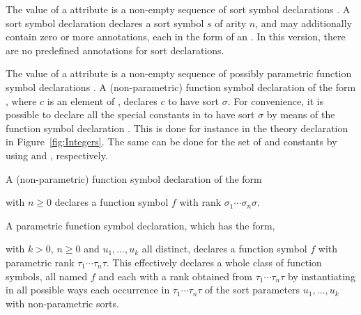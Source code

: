 The value of a  attribute is a non-empty sequence
of sort symbol declarations .
A sort symbol declaration  declares 
a sort symbol $s$ of arity $n$, and 
may additionally contain zero or more annotations,
each in the form of an .
In this version, there are no predefined annotations for sort declarations.

The value of a  attribute is a non-empty sequence
of possibly parametric function symbol declarations .
A (non-parametric) function symbol declaration 
of the form ,
where $c$ is an element of ,
declares $c$ to have sort $\sigma$.
For convenience,
it is possible to declare all the special constants in  
to have sort $\sigma$ by means of the function symbol declaration
.
This is done for instance in the theory declaration in Figure~\ref{fig:Integers}.
The same can be done for the set of  and  constants
by using  and , respectively. 
 
A (non-parametric) function symbol declaration of the form
\begin{center}
\end{center}
with $n \geq 0$ declares a function symbol $f$ with rank $\sigma_1\cdots\sigma_n\sigma$.

A parametric function symbol declaration, which has the form,
\begin{center}
\end{center}
with $k > 0$, $n \geq 0$ and $u_1, \ldots, u_k$ all distinct,
declares a function symbol $f$ with parametric rank $\tau_1\cdots\tau_n\tau$.
This effectively declares a whole class of function symbols, 
all named $f$ and each with a rank obtained from $\tau_1\cdots\tau_n\tau$ 
by instantiating in all possible ways each occurrence in $\tau_1\cdots\tau_n\tau$
of the sort parameters $u_1,\ldots,u_k$ with non-parametric sorts.

